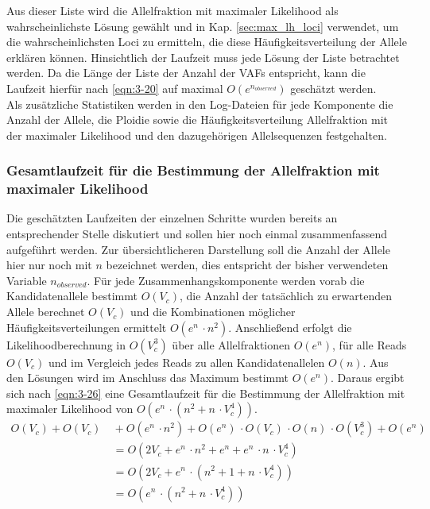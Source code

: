 Aus dieser Liste wird die Allelfraktion mit maximaler Likelihood als wahrscheinlichste Lösung gewählt und in Kap. \ref{sec:max_lh_loci} verwendet, um die wahrscheinlichsten Loci zu ermitteln, die diese Häufigkeitsverteilung der Allele erklären können. Hinsichtlich der Laufzeit muss jede Lösung der Liste betrachtet werden. Da die Länge der Liste der Anzahl der VAFs entspricht, kann die Laufzeit hierfür nach \eqref{eqn:3-20} auf maximal $ O(e^{n_{observed}}) $ geschätzt werden. \\

Als zusätzliche Statistiken werden in den Log-Dateien für jede Komponente die Anzahl der Allele, die Ploidie sowie die Häufigkeitsverteilung Allelfraktion mit der maximaler Likelihood und den dazugehörigen Allelsequenzen festgehalten.

\subsubsection{Gesamtlaufzeit für die Bestimmung der Allelfraktion mit maximaler Likelihood} \label{subsubsec:al_compl}
Die geschätzten Laufzeiten der einzelnen Schritte wurden bereits an entsprechender Stelle diskutiert und sollen hier noch einmal zusammenfassend aufgeführt werden. Zur übersichtlicheren Darstellung soll die Anzahl der Allele hier nur noch mit $n$ bezeichnet werden, dies entspricht der bisher verwendeten Variable $n_{observed}$. Für jede Zusammenhangskomponente werden vorab die Kandidatenallele bestimmt $ O(V_{c}) $, die Anzahl der tatsächlich zu erwartenden Allele berechnet $ O(V_{c}) $ und die Kombinationen möglicher Häufigkeitsverteilungen ermittelt $ O(e^{n} \, \cdotp n^2) $. Anschließend erfolgt die Likelihoodberechnung in $ O(V_{c}^3) $ über alle Allelfraktionen $ O(e^{n}) $, für alle Reads $ O(V_{c}) $ und im Vergleich jedes Reads zu allen Kandidatenallelen $ O(n) $. Aus den Lösungen wird im Anschluss das Maximum bestimmt $ O(e^{n}) $. Daraus ergibt sich nach \ref{eqn:3-26} eine Gesamtlaufzeit für die Bestimmung der Allelfraktion mit maximaler Likelihood von $ O(e^n \, \cdotp (n^2 + n \, \cdotp V_{c}^4)) $. 
\begin{equation} \label{eqn:3-26}
\tag{3-26}
\begin{aligned}
  O(V_{c}) +  O(V_{c}) &\ {} + O(e^n \, \cdotp n^2) + O(e^n) \, \cdotp O(V_{c}) \, \cdotp O(n) \, \cdotp O(V_{c}^3) + O(e^n)\\
&\ =  O(2 V_{c} + e^n \, \cdotp n^2 + e^n + e^n \, \cdotp n \, \cdotp V_{c}^4)\\
&\ = O(2 V_{c} + e^n \, \cdotp (n^2 + 1 + n \, \cdotp V_{c}^4))\\
&\ = O(e^n \, \cdotp (n^2 + n \, \cdotp V_{c}^4)) \\
\end{aligned}
\end{equation}

